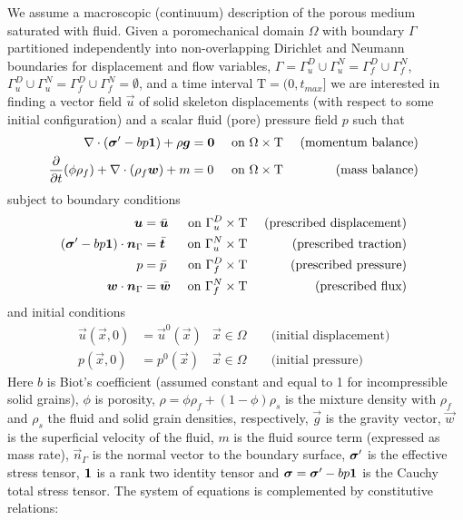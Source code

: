 We assume a macroscopic (continuum) description of the porous medium saturated with fluid.   Given a poromechanical domain $\Omega$ with boundary $\Gamma$ partitioned independently into non-overlapping Dirichlet and Neumann boundaries for displacement and flow variables, $\Gamma = \Gamma_u^D \cup \Gamma_u^N = \Gamma_f^D \cup \Gamma_f^N$, $\Gamma_u^D \cup \Gamma_u^N = \Gamma_f^D \cup \Gamma_f^N = \emptyset$, and a time interval $\mathrm{T} = (0, t_{max}]$ we are interested in finding a vector field $\vec{u}$ of solid skeleton displacements (with respect to some initial configuration) and a scalar fluid (pore) pressure field $p$ such that \cite{Coussy2004}
\begin{align}
    \nabla \cdot \left( \bm{\sigma}^\prime - b p \bm{1} \right) + \rho\bm{g} &= \bm{0} & \mbox{ on } \Omega \times \mathrm{T} & & \mbox{ (momentum balance) } \label{eq:momentum_balance} \\
    \frac{\partial}{\partial t}(\phi \rho_f) + \nabla \cdot (\rho_f \bm{w}) + m &= 0 & \mbox{ on } \Omega \times \mathrm{T} & & \mbox{ (mass balance) } \label{eq:mass_balance}
\end{align}
subject to boundary conditions
\begin{align}
    \bm{u} &= \bar{\bm{u}} & \mbox{ on } \Gamma_u^D \times \mathrm{T} & & \mbox{ (prescribed displacement) }\label{eq:momentum_balance_bc_disp} \\
    \left( \bm{\sigma}^\prime - b p \bm{1} \right) \cdot \bm{n}_\Gamma &= \bar{\bm{t}} & \mbox{ on } \Gamma_u^N \times \mathrm{T} & & \mbox{ (prescribed traction) } \label{eq:momentum_balance_bc_trac} \\
    p &= \bar{p} & \mbox{ on } \Gamma_f^D \times \mathrm{T} & & \mbox{ (prescribed pressure) } \label{eq:mass_balance_bc_pres} \\
    \bm{w} \cdot \bm{n}_\Gamma &= \bar{\bm{w}} & \mbox{ on } \Gamma_f^N \times \mathrm{T} & & \mbox{ (prescribed flux) }\label{eq:mass_balance_bc_flux}
\end{align}
and initial conditions
\begin{align}
    \vec{u}(\vec{x}, 0) &= \vec{u}^0(\vec{x}) & \vec{x} \in \Omega & & \mbox{ (initial displacement) } \label{eq:momentum_balance_ic_disp} \\
    p(\vec{x}, 0) &= p^0(\vec{x}) & \vec{x} \in \Omega & & \mbox{ (initial pressure) } \label{eq:mass_balance_ic_pres}
\end{align}
Here $b$ is Biot's coefficient (assumed constant and equal to 1 for incompressible solid grains), $\phi$ is porosity, $\rho = \phi \rho_f + (1-\phi) \rho_s$ is the mixture density with $\rho_f$ and $\rho_s$ the fluid and solid grain densities, respectively, $\vec{g}$ is the gravity vector, $\vec{w}$ is the superficial velocity of the fluid, $m$ is the fluid source term (expressed as mass rate), $\vec{n}_\Gamma$ is the normal vector to the boundary surface, $\bm{\sigma}^\prime$ is the effective stress tensor, $\bm{1}$ is a rank two identity tensor and $\bm{\sigma} = \bm{\sigma}^\prime - b p \bm{1}$ is the Cauchy total stress tensor.   The system of equations is complemented by constitutive relations:
